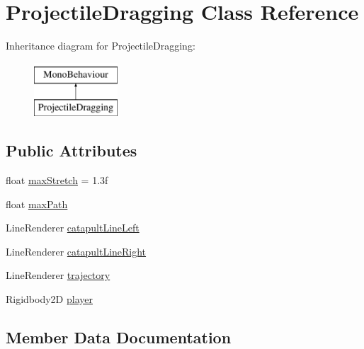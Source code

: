 \hypertarget{classProjectileDragging}{}\section{Projectile\+Dragging Class Reference}
\label{classProjectileDragging}
Inheritance diagram for Projectile\+Dragging\+:\begin{figure}[H]
\begin{center}
\leavevmode
\includegraphics[height=2.000000cm]{classProjectileDragging}
\end{center}
\end{figure}
\subsection*{Public Attributes}
\begin{DoxyCompactItemize}
\item 
float \hyperlink{classProjectileDragging_a543a037b4fe07cb253d6aaa519491d4b}{max\+Stretch} = 1.\+3f
\item 
float \hyperlink{classProjectileDragging_ae08a87c1eccb1c683893e66d648d2bbe}{max\+Path}
\item 
Line\+Renderer \hyperlink{classProjectileDragging_ae2b859534673bab938dcfed0e45df930}{catapult\+Line\+Left}
\item 
Line\+Renderer \hyperlink{classProjectileDragging_a1c80c1a55b8e672fe27b709af7c9cb1e}{catapult\+Line\+Right}
\item 
Line\+Renderer \hyperlink{classProjectileDragging_a2ab40fc38512c50f3ccbc00fb19aea4b}{trajectory}
\item 
Rigidbody2D \hyperlink{classProjectileDragging_a1d13cb645eb6ccb4b48d4606b83a7cf1}{player}
\end{DoxyCompactItemize}


\subsection{Member Data Documentation}
\mbox{\label{classProjectileDragging_ae2b859534673bab938dcfed0e45df930}} 
